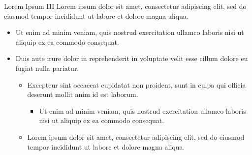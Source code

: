 \begin{titledbox}{Lorem Ipsum III}
    Lorem ipsum dolor sit amet, consectetur adipiscing elit, sed do
    eiusmod tempor incididunt ut labore et dolore magna aliqua.
    \begin{itemize}
        \item Ut enim ad minim veniam, quis nostrud exercitation ullamco
            laboris nisi ut aliquip ex ea commodo consequat.
        \item Duis aute irure dolor in reprehenderit in voluptate velit
            esse cillum dolore eu fugiat nulla pariatur.
            \begin{itemize}
                \item Excepteur sint occaecat cupidatat non proident,
                    sunt in culpa qui officia deserunt mollit anim id
                    est laborum.
                    \begin{itemize}
                        \item Ut enim ad minim veniam, quis nostrud
                            exercitation ullamco laboris nisi ut aliquip
                            ex ea commodo consequat.
                    \end{itemize}
                \item Lorem ipsum dolor sit amet, consectetur adipiscing
                    elit, sed do eiusmod tempor incididunt ut labore et
                    dolore magna aliqua.
            \end{itemize}
    \end{itemize}
\end{titledbox}